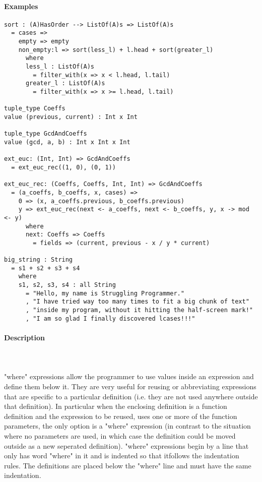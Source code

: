 \documentclass{article}
\def\pend{\mbox{} \\\\}
\begin{document}
\paragraph{Examples}
\begin{verbatim}
sort : (A)HasOrder --> ListOf(A)s => ListOf(A)s
  = cases => 
    empty => empty
    non_empty:l => sort(less_l) + l.head + sort(greater_l)
      where
      less_l : ListOf(A)s
        = filter_with(x => x < l.head, l.tail)
      greater_l : ListOf(A)s
        = filter_with(x => x >= l.head, l.tail)

tuple_type Coeffs
value (previous, current) : Int x Int

tuple_type GcdAndCoeffs
value (gcd, a, b) : Int x Int x Int

ext_euc: (Int, Int) => GcdAndCoeffs
  = ext_euc_rec((1, 0), (0, 1))

ext_euc_rec: (Coeffs, Coeffs, Int, Int) => GcdAndCoeffs
  = (a_coeffs, b_coeffs, x, cases) =>
    0 => (x, a_coeffs.previous, b_coeffs.previous)
    y => ext_euc_rec(next <- a_coeffs, next <- b_coeffs, y, x -> mod <- y)
      where
      next: Coeffs => Coeffs
        = fields => (current, previous - x / y * current)

big_string : String
  = s1 + s2 + s3 + s4
    where
    s1, s2, s3, s4 : all String
      = "Hello, my name is Struggling Programmer."
      , "I have tried way too many times to fit a big chunk of text"
      , "inside my program, without it hitting the half-screen mark!"
      , "I am so glad I finally discovered lcases!!!"
\end{verbatim}

\paragraph{Description}\pend
"where" expressions allow the programmer to use values inside an expression and
define them below it. They are very useful for reusing or abbreviating
expressions that are specific to a particular definition (i.e. they are not
used anywhere outside that definition). In particular when the enclosing
definition is a function definition and the expression to be reused, uses one
or more of the function parameters, the only option is a "where" expression (in
contrast to the situation where no parameters are used, in which case the
definition could be moved outside as a new seperated definition).  "where"
expressions begin by a line that only has word "where" in it and is indented so
that itfollows the indentation rules.  The definitions are placed below the
"where" line and must have the same indentation.
\end{document}
